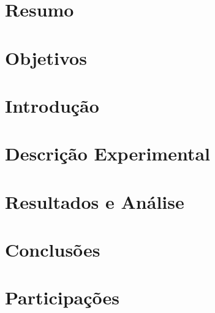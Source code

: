 \documentclass[a4paper]{article}
\begin{document}
\newpage

{}
\large
\lipsum[1]
\section{Resumo}
\lipsum[2-3]
\section{Objetivos}
\lipsum[4-5]
\section{Introdução}
\lipsum[6-8]
\section{Descrição Experimental}
\lipsum[9-10]
\section{Resultados e Análise}
\lipsum[11-12]
\section{Conclusões}
\lipsum[13-15]
\section{Participações}
\lipsum[16]



\end{document}

